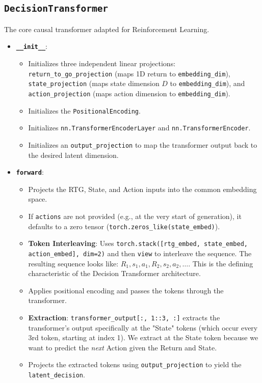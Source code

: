 \documentclass[12pt,a4paper]{report}
\begin{document}
\subsection{\texttt{DecisionTransformer}}
The core causal transformer adapted for Reinforcement Learning.
\begin{itemize}
    \item \textbf{\texttt{\_\_init\_\_}}: 
    \begin{itemize}
        \item Initializes three independent linear projections: \texttt{return\_to\_go\_projection} (maps 1D return to \texttt{embedding\_dim}), \texttt{state\_projection} (maps state dimension $D$ to \texttt{embedding\_dim}), and \texttt{action\_projection} (maps action dimension to \texttt{embedding\_dim}).
        \item Initializes the \texttt{PositionalEncoding}.
        \item Initializes \texttt{nn.TransformerEncoderLayer} and \texttt{nn.TransformerEncoder}. 
        \item Initializes an \texttt{output\_projection} to map the transformer output back to the desired latent dimension.
    \end{itemize}
    \item \textbf{\texttt{forward}}:
    \begin{itemize}
        \item Projects the RTG, State, and Action inputs into the common embedding space.
        \item If \texttt{actions} are not provided (e.g., at the very start of generation), it defaults to a zero tensor (\texttt{torch.zeros\_like(state\_embed)}).
        \item \textbf{Token Interleaving}: Uses \texttt{torch.stack([rtg\_embed, state\_embed, action\_embed], dim=2)} and then \texttt{view} to interleave the sequence. The resulting sequence looks like: $R_1, s_1, a_1, R_2, s_2, a_2, \dots$. This is the defining characteristic of the Decision Transformer architecture.
        \item Applies positional encoding and passes the tokens through the transformer.
        \item \textbf{Extraction}: \texttt{transformer\_output[:, 1::3, :]} extracts the transformer's output specifically at the "State" tokens (which occur every 3rd token, starting at index 1). We extract at the State token because we want to predict the \textit{next} Action given the Return and State.
        \item Projects the extracted tokens using \texttt{output\_projection} to yield the \texttt{latent\_decision}.
    \end{itemize}
\end{itemize}
\end{document}
